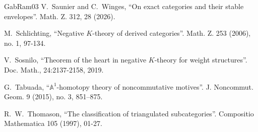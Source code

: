 \documentclass[11pt,leqno]{amsart}
\numberwithin{equation}{section}
\def\A{{\mathbb A}}
\begin{document}
\begin{thebibliography}{GabRam03}
 V.~Saunier and C.~Winges, ``On exact categories and their stable envelopes''. Math. Z. 312, 28 (2026).

 M.~Schlichting, ``Negative $K$-theory of derived categories''. Math. Z. 253 (2006), no. 1, 97-134. 




V.~Sosnilo, ``Theorem of the heart in negative $K$-theory for weight structures''. Doc. Math., 24:2137-2158, 2019.




 G.~Tabuada, ``$\A^1$-homotopy theory of noncommutative motives''. J. Noncommut. Geom. 9 (2015), no. 3,
851–875.


R.~W.~Thomason, ``The classification of triangulated subcategories''. Compositio Mathematica 105 (1997), 01-27.




\end{thebibliography}
\end{document}
